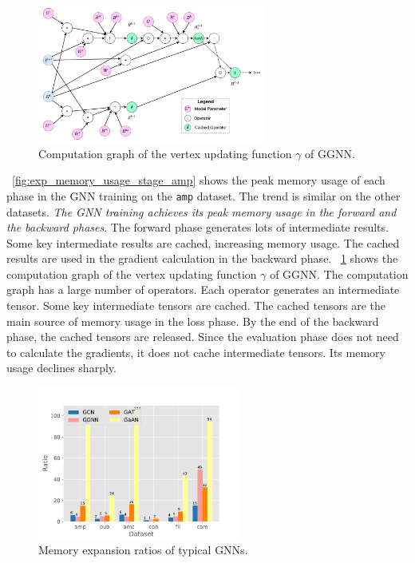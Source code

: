 \begin{figure}[tbp]
    \centering
    \includegraphics[height=4.5cm]{figs/illustration/ggnn_vertex_func_computation_graph.pdf}
    \caption{Computation graph of the vertex updating function $\gamma$ of GGNN.}
    \label{fig:ggnn_vertex_func_computation_graph}
\end{figure}

\figurename~\ref{fig:exp_memory_usage_stage_amp} shows the peak memory usage of each phase in the GNN training on the \texttt{amp} dataset.
The trend is similar on the other datasets.
\emph{The GNN training achieves its peak memory usage in the forward and the backward phases}.
The forward phase generates lots of intermediate results.
Some key intermediate results are cached, increasing memory usage.
The cached results are used in the gradient calculation in the backward phase.
\figurename~\ref{fig:ggnn_vertex_func_computation_graph} shows the computation graph of the vertex updating function $\gamma$ of GGNN.
The computation graph has a large number of operators. Each operator generates an intermediate tensor.
Some key intermediate tensors are cached.
The cached tensors are the main source of memory usage in the loss phase.
By the end of the backward phase, the cached tensors are released.
Since the evaluation phase does not need to calculate the gradients, it does not cache intermediate tensors.
Its memory usage declines sharply.

\begin{figure}[tbp]
    \centering
    \includegraphics[height=5cm]{figs/experiments/exp_memory_expansion_ratio.pdf}
    \caption{Memory expansion ratios of typical GNNs.}
    \label{fig:exp_memory_expansion_ratio}
\end{figure}

